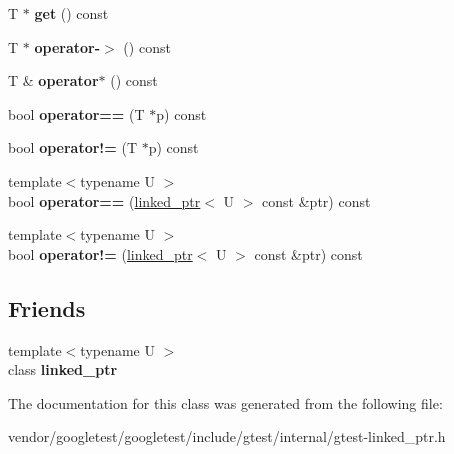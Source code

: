 \begin{DoxyCompactItemize}
T $\ast$ {\bfseries get} () const
\item 
\mbox{\label{classtesting_1_1internal_1_1linked__ptr_a23ff85ac97eed03e945034b65c8eb900}} 
T $\ast$ {\bfseries operator-\/$>$} () const
\item 
\mbox{\label{classtesting_1_1internal_1_1linked__ptr_ac94ad266bf41cbf979a95ca2870908d9}} 
T \& {\bfseries operator$\ast$} () const
\item 
\mbox{\label{classtesting_1_1internal_1_1linked__ptr_ad87ac8ff5543b6fad66e2f3c9844581a}} 
bool {\bfseries operator==} (T $\ast$p) const
\item 
\mbox{\label{classtesting_1_1internal_1_1linked__ptr_a10305395af92bd2fec7bca085cabc99c}} 
bool {\bfseries operator!=} (T $\ast$p) const
\item 
\mbox{\label{classtesting_1_1internal_1_1linked__ptr_a79306e959a4ae7b3a9da641d2ba06ce6}} 
{\footnotesize template$<$typename U $>$ }\\bool {\bfseries operator==} (\mbox{\hyperlink{classtesting_1_1internal_1_1linked__ptr}{linked\+\_\+ptr}}$<$ U $>$ const \&ptr) const
\item 
\mbox{\label{classtesting_1_1internal_1_1linked__ptr_a4801114a83a9e12b08f90e0d28318f26}} 
{\footnotesize template$<$typename U $>$ }\\bool {\bfseries operator!=} (\mbox{\hyperlink{classtesting_1_1internal_1_1linked__ptr}{linked\+\_\+ptr}}$<$ U $>$ const \&ptr) const
\end{DoxyCompactItemize}
\subsection*{Friends}
\begin{DoxyCompactItemize}
\item 
\mbox{\label{classtesting_1_1internal_1_1linked__ptr_a7763f286ca03a7f7363a033d996c8c1c}} 
{\footnotesize template$<$typename U $>$ }\\class {\bfseries linked\+\_\+ptr}
\end{DoxyCompactItemize}


The documentation for this class was generated from the following file\+:\begin{DoxyCompactItemize}
\item 
vendor/googletest/googletest/include/gtest/internal/gtest-\/linked\+\_\+ptr.\+h\end{DoxyCompactItemize}
